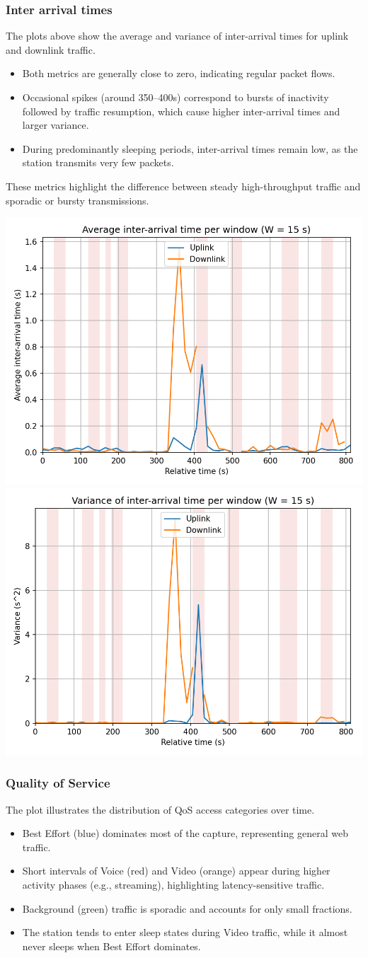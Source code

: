 \documentclass[a4paper,10pt]{article}
\begin{document}
\subsubsection*{Inter arrival times}
The plots above show the average and variance of inter-arrival times for uplink and downlink traffic.
\begin{itemize}
    \item Both metrics are generally close to zero, indicating regular packet flows.
    \item Occasional spikes (around 350–400s) correspond to bursts of inactivity followed by traffic resumption, which cause higher inter-arrival times and larger variance.
    \item During predominantly sleeping periods, inter-arrival times remain low, as the station transmits very few packets.
\end{itemize}
These metrics highlight the difference between steady high-throughput traffic and sporadic or bursty transmissions.

\begin{center}
    \includegraphics[width=.4\textwidth]{img/plot_iat_avg_W15.png}
    \includegraphics[width=.4\textwidth]{img/plot_iat_var_W15.png}
\end{center}

\subsubsection*{Quality of Service}
The plot illustrates the distribution of QoS access categories over time.
\begin{itemize}
    \item Best Effort (blue) dominates most of the capture, representing general web traffic.
    \item Short intervals of Voice (red) and Video (orange) appear during higher activity phases (e.g., streaming), highlighting latency-sensitive traffic.
    \item Background (green) traffic is sporadic and accounts for only small fractions.
    \item The station tends to enter sleep states during Video traffic, while it almost never sleeps when Best Effort dominates.
\end{itemize}
\end{document}
